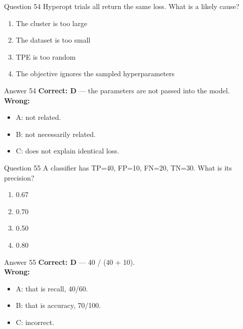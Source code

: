 \documentclass[aspectratio=169,11pt]{beamer}
\begin{document}
\begin{frame}{Question 54}
Hyperopt trials all return the same loss. What is a likely cause?
\begin{enumerate}[label=\Alph*.]
\item The cluster is too large
\item The dataset is too small
\item TPE is too random
\item The objective ignores the sampled hyperparameters
\end{enumerate}
\end{frame}
\begin{frame}{Answer 54}
\textbf{Correct: D} --- the parameters are not passed into the model.\\
\vspace{0.5em}
\textbf{Wrong:}
\begin{itemize}
\item A: not related.
\item B: not necessarily related.
\item C: does not explain identical loss.
\end{itemize}
\end{frame}

\begin{frame}{Question 55}
A classifier has TP=40, FP=10, FN=20, TN=30. What is its precision?
\begin{enumerate}[label=\Alph*.]
\item 0.67
\item 0.70
\item 0.50
\item 0.80
\end{enumerate}
\end{frame}
\begin{frame}{Answer 55}
\textbf{Correct: D} --- 40 / (40 + 10).\\
\vspace{0.5em}
\textbf{Wrong:}
\begin{itemize}
\item A: that is recall, 40/60.
\item B: that is accuracy, 70/100.
\item C: incorrect.
\end{itemize}
\end{frame}
\end{document}
